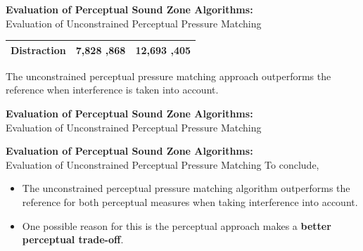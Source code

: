 \documentclass[aspectratio=169]{beamer}
\begin{document}
\begin{frame}{\textbf{Evaluation of Perceptual Sound Zone Algorithms:}\\ Evaluation of Unconstrained
    Perceptual Pressure Matching}
\begin{table}[]
\begin{tabular}{lS[round-mode=places]S[round-mode=places]}
        Distraction                 & 7,828                  ,868              & 12,693                ,405                              \\ 
        \bottomrule
    \end{tabular}
    \end{table}
    The unconstrained perceptual pressure matching approach outperforms the reference when interference is taken into account.
\end{frame}

\begin{frame}{\textbf{Evaluation of Perceptual Sound Zone Algorithms:}\\ Evaluation of Unconstrained
    Perceptual Pressure Matching}
    \begin{figure}[]
        \centering
        \scalebox{0.55}{}
    \end{figure}
\end{frame}

\begin{frame}{\textbf{Evaluation of Perceptual Sound Zone Algorithms:}\\ Evaluation of Unconstrained
    Perceptual Pressure Matching}
    To conclude, 
    \begin{itemize}
        \item The unconstrained perceptual pressure matching algorithm outperforms the reference for both perceptual measures when taking interference
            into account.
        \item One possible reason for this is the perceptual approach makes a \textbf{better perceptual trade-off}.
    \end{itemize}
\end{frame}
\end{document}
